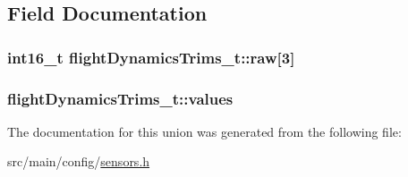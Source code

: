 \subsection{Field Documentation}
\hypertarget{unionflightDynamicsTrims__t_a6f8db9985687ddf7f957d83a5a3fee9a}{
\subsubsection[{raw}]{\setlength{\rightskip}{0pt plus 5cm}int16\+\_\+t flight\+Dynamics\+Trims\+\_\+t\+::raw\mbox{[}3\mbox{]}}}\label{unionflightDynamicsTrims__t_a6f8db9985687ddf7f957d83a5a3fee9a}
\hypertarget{unionflightDynamicsTrims__t_ae18b1c5536bbc8f659b573927cacf0ec}{
\subsubsection[{values}]{ flight\+Dynamics\+Trims\+\_\+t\+::values}}\label{unionflightDynamicsTrims__t_ae18b1c5536bbc8f659b573927cacf0ec}


The documentation for this union was generated from the following file\+:\begin{DoxyCompactItemize}
\item 
src/main/config/\hyperlink{sensors_8h}{sensors.\+h}\end{DoxyCompactItemize}
